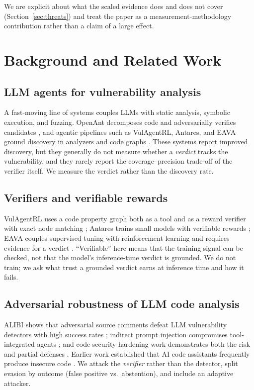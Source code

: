 \documentclass[conference]{IEEEtran}
\begin{document}
We are explicit about what the scaled evidence does and does not cover
(Section~\ref{sec:threats}) and treat the paper as a measurement-methodology
contribution rather than a claim of a large effect.

\section{Background and Related Work}
\subsection{LLM agents for vulnerability analysis}
A fast-moving line of systems couples LLMs with static analysis, symbolic
execution, and fuzzing. OpenAnt decomposes code and adversarially verifies
candidates \cite{openant}, and agentic pipelines such as VulAgentRL, Antares, and
EAVA ground discovery in analyzers and code graphs \cite{vulagentrl,antares,eava}.
These systems report improved discovery, but they generally do not measure whether
a \emph{verdict} tracks the vulnerability, and they rarely report the
coverage--precision trade-off of the verifier itself. We measure the verdict rather
than the discovery rate.

\subsection{Verifiers and verifiable rewards}
VulAgentRL uses a code property graph both as a tool and as a reward verifier with
exact node matching \cite{vulagentrl}; Antares trains small models with verifiable
rewards \cite{antares}; EAVA couples supervised tuning with reinforcement learning
and requires evidence for a verdict \cite{eava}. ``Verifiable'' here means that the
training signal can be checked, not that the model's inference-time verdict is
grounded. We do not train; we ask what trust a grounded verdict earns at inference
time and how it fails.

\subsection{Adversarial robustness of LLM code analysis}
ALIBI shows that adversarial source comments defeat LLM vulnerability detectors
with high success rates \cite{alibi}; indirect prompt injection compromises
tool-integrated agents \cite{greshake2023not}; and code security-hardening work
demonstrates both the risk and partial defenses \cite{he2023large}. Earlier work
established that AI code assistants frequently produce insecure code
\cite{pearce2022asleep,perry2023do}. We attack the \emph{verifier} rather than the
detector, split evasion by outcome (false positive vs.\ abstention), and include an
adaptive attacker.
\end{document}
